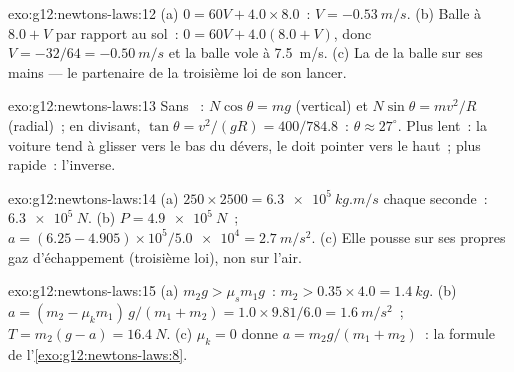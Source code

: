 \begin{solution}{exo:g12:newtons-laws:12}
(a) $0 = 60V + 4.0 \times 8.0$~: $V = \qty{-0.53}{m/s}$.
(b) Balle à $8.0 + V$ par rapport au sol~: $0 = 60V + 4.0(8.0 + V)$,
donc $V = -32/64 = \qty{-0.50}{m/s}$ et la balle vole à \qty{7.5}{m/s}.
(c) La  de la balle sur ses mains --- le partenaire de la
troisième loi de son lancer.
\end{solution}

\begin{solution}{exo:g12:newtons-laws:13}
Sans ~: $N\cos\theta = mg$ (vertical) et $N\sin\theta =
mv^2/R$ (radial)~; en divisant, $\tan\theta = v^2/(gR) = 400/784.8$~:
$\theta \approx 27^\circ$. Plus lent~: la voiture tend à glisser vers
le bas du dévers, le  doit pointer vers le haut~; plus
rapide~: l'inverse.
\end{solution}

\begin{solution}{exo:g12:newtons-laws:14}
(a) $250 \times 2500 = \qty{6.3e5}{kg.m/s}$ chaque seconde~: 
$\qty{6.3e5}{N}$. (b) $P = \qty{4.9e5}{N}$~;
$a = (6.25 - 4.905) \times 10^5 / \num{5.0e4} = \qty{2.7}{m/s^2}$.
(c) Elle pousse sur ses propres gaz d'échappement (troisième loi), non
sur l'air.
\end{solution}

\begin{solution}{exo:g12:newtons-laws:15}
(a) $m_2 g > \mu_s m_1 g$~: $m_2 > 0.35 \times 4.0 = \qty{1.4}{kg}$.
(b) $a = (m_2 - \mu_k m_1)\,g/(m_1 + m_2) = 1.0 \times 9.81/6.0 =
\qty{1.6}{m/s^2}$~; $T = m_2(g - a) = \qty{16.4}{N}$.
(c) $\mu_k = 0$ donne $a = m_2 g/(m_1 + m_2)$~: la formule de
l'\cref{exo:g12:newtons-laws:8}.
\end{solution}

